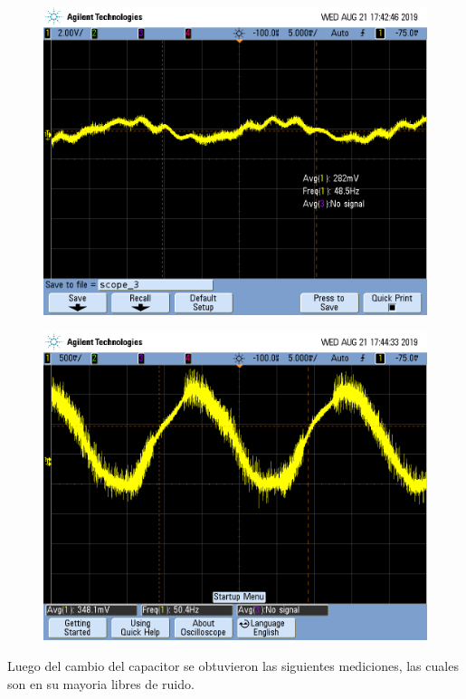\begin{figure}[H]
\centering
\begin{minipage}{.5\textwidth}
  \centering
  \includegraphics[width=.99\linewidth]{imagenes/RS2CORTO.png}
  \label{fig:ib+TL}
\end{minipage}%
\begin{minipage}{.5\textwidth}
  \centering
  \includegraphics[width=.99\linewidth]{imagenes/RS1CORTO.png}
  \label{fig:ib-TL}
\end{minipage}
\end{figure}
Luego del cambio del capacitor  se obtuvieron las siguientes mediciones, las cuales son en su mayoria libres de ruido.

